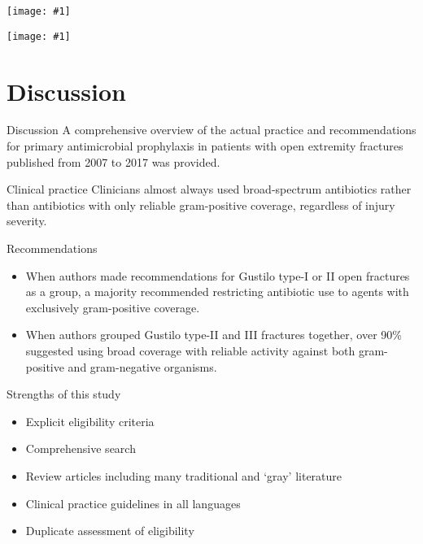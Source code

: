 \documentclass{beamer}
\newcommand*{\solo}[1]{\centering\texttt{[image: \#1]}}
\begin{document}
\begin{frame}
    \solo{E2.pdf}
\end{frame}

\begin{frame}
    \solo{E3.pdf}
\end{frame}

\section{Discussion}
\begin{frame}{Discussion}
    A comprehensive overview of the actual practice and recommendations for
    primary antimicrobial prophylaxis in patients with open extremity fractures
    published from 2007 to 2017 was provided.
\end{frame}

\begin{frame}{Clinical practice}
    Clinicians almost always used broad-spectrum antibiotics rather than
    antibiotics with only reliable gram-positive coverage, regardless of injury
    severity.
\end{frame}

\begin{frame}{Recommendations}
    \begin{itemize}
        \item When authors made recommendations for Gustilo type-I or II open
              fractures as a group, a majority recommended restricting
              antibiotic use to agents with exclusively gram-positive coverage.
        \item When authors grouped Gustilo type-II and III fractures together,
              over 90\% suggested using broad coverage with reliable activity
              against both gram-positive and gram-negative organisms.
    \end{itemize}
\end{frame}

\begin{frame}{Strengths of this study}
    \begin{itemize}
        \item Explicit eligibility criteria
        \item Comprehensive search
        \item Review articles including many traditional and `gray' literature
        \item Clinical practice guidelines in all languages
        \item Duplicate assessment of eligibility
    \end{itemize}
\end{frame}
\end{document}
